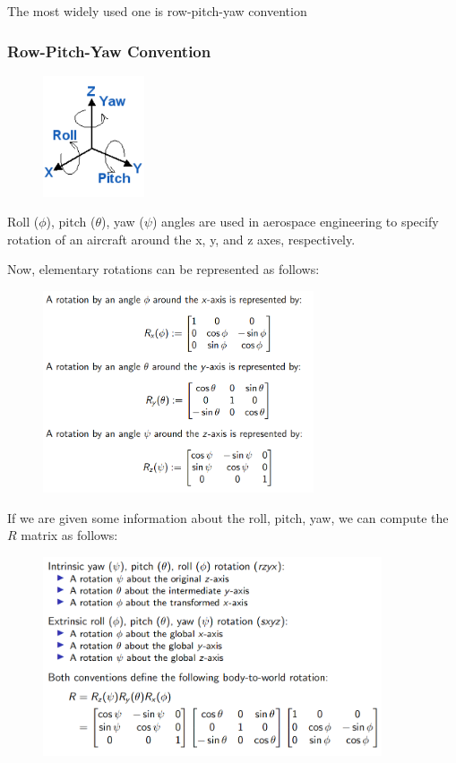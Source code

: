 The most widely used one is row-pitch-yaw convention

\subsubsection{Row-Pitch-Yaw Convention}

\begin{figure}[h]\centering\includegraphics[width=3cm]{img/j_3_6.png}\end{figure}

Roll ($\phi$), pitch ($\theta$), yaw ($\psi$) angles are used in aerospace engineering to specify rotation of an aircraft around the x, y, and z axes, respectively.

Now, elementary rotations can be represented as follows:

\begin{figure}[h]\centering\includegraphics[width=8cm]{img/j_3_7.png}\end{figure}

If we are given some information about the roll, pitch, yaw, we can compute the $R$ matrix as follows: \clearpage

\begin{figure}[h]\centering\includegraphics[width=10cm]{img/j_3_8.png}\end{figure}

